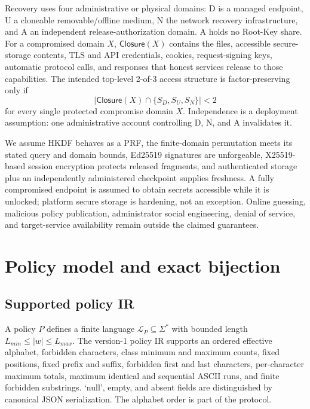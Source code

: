 \documentclass[preprint,12pt]{elsarticle}
\newcommand{\Lang}{\mathcal{L}}
\begin{document}
Recovery uses four administrative or physical domains: D is a managed
endpoint, U a cloneable removable/offline medium, N the network recovery
infrastructure, and A an independent release-authorization domain. A holds no
Root-Key share. For a compromised domain $X$, $\mathsf{Closure}(X)$ contains
the files, accessible secure-storage contents, TLS and API credentials,
cookies, request-signing keys, automatic protocol calls, and responses that
honest services release to those capabilities. The intended top-level 2-of-3
access structure is factor-preserving only if
\[
|\mathsf{Closure}(X)\cap\{S_D,S_U,S_N\}|<2
\]
for every single protected compromise domain $X$. Independence is a deployment
assumption: one administrative account controlling D, N, and A invalidates it.

We assume HKDF behaves as a PRF, the finite-domain permutation meets its stated
query and domain bounds, Ed25519 signatures are unforgeable, X25519-based
session encryption protects released fragments, and authenticated storage plus
an independently administered checkpoint supplies freshness. A fully
compromised endpoint is assumed to obtain secrets accessible while it is
unlocked; platform secure storage is hardening, not an exception. Online
guessing, malicious policy publication, administrator social engineering,
denial of service, and target-service availability remain outside the claimed
guarantees.



\section{Policy model and exact bijection}

\subsection{Supported policy IR}

A policy $P$ defines a finite language $\Lang_P\subseteq\Sigma^*$ with bounded
length $L_{min}\le |w|\le L_{max}$. The version-1 policy IR supports an ordered
effective alphabet, forbidden characters, class minimum and maximum counts,
fixed positions, fixed prefix and suffix, forbidden first and last characters,
per-character maximum totals, maximum identical and sequential ASCII runs, and
finite forbidden substrings. `null', empty, and absent fields are distinguished
by canonical JSON serialization. The alphabet order is part of the protocol.
\end{document}
